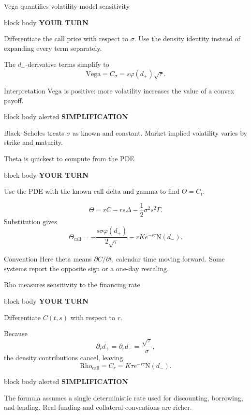 \documentclass[handout,10pt,aspectratio=169]{beamer}
\newenvironment{simplificationbox}{%
  \begin{beamercolorbox}[rounded=true,sep=0.7em,wd=\textwidth]{block body alerted}
  \textbf{\color{CourseRed}SIMPLIFICATION}\quad
}{\end{beamercolorbox}}
\newenvironment{pausebox}{%
  \begin{beamercolorbox}[rounded=true,sep=0.8em,wd=\textwidth]{block body}
  \textbf{\color{CourseGold}YOUR TURN}\quad
}{\end{beamercolorbox}}
\newcommand{\Ncdf}{\mathrm N}
\newcommand{\phiN}{\varphi}
\newcommand{\1}{\mathbf 1}
\begin{document}
\begin{frame}{Vega quantifies volatility-model sensitivity}
\begin{pausebox}
Differentiate the call price with respect to \(\sigma\). Use the density
identity instead of expanding every term separately.
\end{pausebox}

The \(d_\pm\)-derivative terms simplify to
\[
\boxed{
\mathrm{Vega}=C_\sigma=s\phiN(d_+)\sqrt{\tau}.}
\]
\begin{block}{Interpretation}
Vega is positive: more volatility increases the value of a convex payoff.
\end{block}
\begin{simplificationbox}
Black--Scholes treats \(\sigma\) as known and constant. Market implied
volatility varies by strike and maturity.
\end{simplificationbox}
\end{frame}

\begin{frame}{Theta is quickest to compute from the PDE}
\begin{pausebox}
Use the PDE with the known call delta and gamma to find \(\Theta=C_t\).
\end{pausebox}

\[
\Theta
=rC-rs\Delta-\frac12\sigma^2s^2\Gamma.
\]
Substitution gives
\[
\boxed{
\Theta_{\mathrm{call}}
=-\frac{s\sigma\phiN(d_+)}{2\sqrt{\tau}}
-rKe^{-r\tau}\Ncdf(d_-).}
\]
\begin{alertblock}{Convention}
Here theta means \(\partial C/\partial t\), calendar time moving forward.
Some systems report the opposite sign or a one-day rescaling.
\end{alertblock}
\end{frame}

\begin{frame}{Rho measures sensitivity to the financing rate}
\begin{pausebox}
Differentiate \(C(t,s)\) with respect to \(r\).
\end{pausebox}

Because
\[
\partial_r d_+=\partial_r d_-=\frac{\sqrt{\tau}}{\sigma},
\]
the density contributions cancel, leaving
\[
\boxed{
\mathrm{Rho}_{\mathrm{call}}
=C_r=K\tau e^{-r\tau}\Ncdf(d_-).}
\]
\begin{simplificationbox}
The formula assumes a single deterministic rate used for discounting,
borrowing, and lending. Real funding and collateral conventions are richer.
\end{simplificationbox}
\end{frame}
\end{document}
